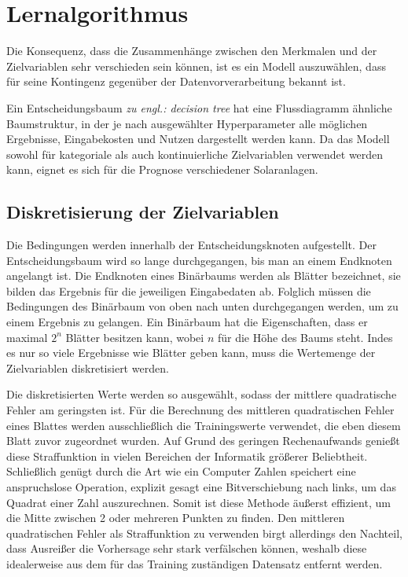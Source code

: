 \documentclass[12pt, a4paper]{article}
\begin{document}
\newpage

\section{Lernalgorithmus}
\label{sec:algorithm}

Die Konsequenz, dass die Zusammenhänge zwischen den Merkmalen und der Zielvariablen sehr verschieden sein können, ist es ein Modell auszuwählen, dass für seine Kontingenz gegenüber der Datenvorverarbeitung bekannt ist. 

Ein Entscheidungsbaum \textit{zu engl.: decision tree} hat eine Flussdiagramm ähnliche Baumstruktur, in der je nach ausgewählter Hyperparameter alle möglichen Ergebnisse, Eingabekosten und Nutzen dargestellt werden kann. Da das Modell sowohl für kategoriale als auch kontinuierliche Zielvariablen verwendet werden kann, eignet es sich für die Prognose verschiedener Solaranlagen. 

\subsection{Diskretisierung der Zielvariablen}

Die Bedingungen werden innerhalb der Entscheidungsknoten aufgestellt. Der Entscheidungsbaum wird so lange durchgegangen, bis man an einem Endknoten angelangt ist. Die Endknoten eines Binärbaums werden als Blätter bezeichnet, sie bilden das Ergebnis für die jeweiligen Eingabedaten ab. Folglich müssen die Bedingungen des Binärbaum von oben nach unten durchgegangen werden, um zu einem Ergebnis zu gelangen. Ein Binärbaum hat die Eigenschaften, dass er maximal $2^{n}$ Blätter besitzen kann, wobei $n$ für die Höhe des Baums steht. Indes es nur so viele Ergebnisse wie Blätter geben kann, muss die Wertemenge der Zielvariablen diskretisiert werden. 

Die diskretisierten Werte werden so ausgewählt, sodass der mittlere quadratische Fehler am geringsten ist. Für die Berechnung des mittleren quadratischen Fehler eines Blattes werden ausschließlich die Trainingswerte verwendet, die eben diesem Blatt zuvor zugeordnet wurden. Auf Grund des geringen Rechenaufwands genießt diese Straffunktion in vielen Bereichen der Informatik größerer Beliebtheit. Schließlich genügt durch die Art wie ein Computer Zahlen speichert eine anspruchslose Operation, explizit gesagt eine Bitverschiebung nach links, um das Quadrat einer Zahl auszurechnen. Somit ist diese Methode äußerst effizient, um die Mitte zwischen 2 oder mehreren Punkten zu finden. Den mittleren quadratischen Fehler als Straffunktion zu verwenden birgt allerdings den Nachteil, dass Ausreißer die Vorhersage sehr stark verfälschen können, weshalb diese idealerweise aus dem für das Training zuständigen Datensatz entfernt werden.
\end{document}
